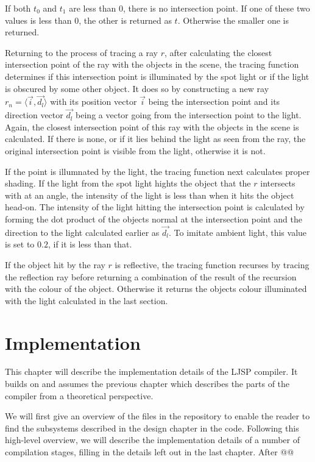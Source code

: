 \documentclass[11pt]{report}
\begin{document}
If both $t_0$ and $t_1$ are less than $0$, there is no intersection point. If one of these two values is less than $0$, the other is returned as $t$. Otherwise the smaller one is returned.

Returning to the process of tracing a ray $r$, after calculating the closest intersection point of the ray with the objects in the scene, the tracing function determines if this intersection point is illuminated by the spot light or if the light is obscured by some other object. It does so by constructing a new ray $r_n = \langle \vec{i}, \vec{d_l} \rangle$ with its position vector $\vec{i}$ being the intersection point and its direction vector $\vec{d_l}$ being a vector going from the intersection point to the light. Again, the closest intersection point of this ray with the objects in the scene is calculated. If there is none, or if it lies behind the light as seen from the ray, the original intersection point is visible from the light, otherwise it is not.

If the point is illumnated by the light, the tracing function next calculates proper shading. If the light from the spot light hights the object that the $r$ intersects with at an angle, the intensity of the light is less than when it hits the object head-on. The intensity of the light hitting the intersection point is calculated by forming the dot product of the objects normal at the intersection point and the direction to the light calculated earlier as $\vec{d_l}$. To imitate ambient light, this value is set to $0.2$, if it is less than that.

If the object hit by the ray $r$ is reflective, the tracing function recurses by tracing the reflection ray before returning a combination of the result of the recursion with the colour of the object. Otherwise it returns the objects colour illuminated with the light calculated in the last section.

\chapter{Implementation}

This chapter will describe the implementation details of the LJSP compiler. It builds on and assumes the previous chapter which describes the parts of the compiler from a theoretical perspective.

We will first give an overview of the files in the repository to enable the reader to find the subsystems described in the design chapter in the code. Following this high-level overview, we will describe the implementation details of a number of compilation stages, filling in the details left out in the last chapter. After @@
\end{document}
